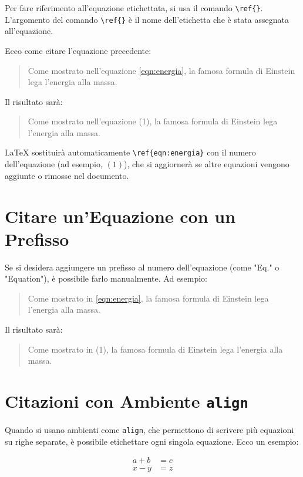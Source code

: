 Per fare riferimento all'equazione etichettata, si usa il comando \verb|\ref{}|. L'argomento del comando \verb|\ref{}| è il nome dell'etichetta che è stata assegnata all'equazione.

Ecco come citare l'equazione precedente:

\begin{quote}
	Come mostrato nell'equazione \ref{eqn:energia}, la famosa formula di Einstein lega l'energia alla massa.
\end{quote}

Il risultato sarà:

\begin{quote}
	Come mostrato nell'equazione (1), la famosa formula di Einstein lega l'energia alla massa.
\end{quote}

LaTeX sostituirà automaticamente \verb|\ref{eqn:energia}| con il numero dell'equazione (ad esempio, \((1)\)), che si aggiornerà se altre equazioni vengono aggiunte o rimosse nel documento.

\section{Citare un'Equazione con un Prefisso}

Se si desidera aggiungere un prefisso al numero dell'equazione (come "Eq." o "Equation"), è possibile farlo manualmente. Ad esempio:

\begin{quote}
	Come mostrato in  \ref{eqn:energia}, la famosa formula di Einstein lega l'energia alla massa.
\end{quote}

Il risultato sarà:

\begin{quote}
	Come mostrato in  (1), la famosa formula di Einstein lega l'energia alla massa.
\end{quote}

\section{Citazioni con Ambiente \texttt{align}}

Quando si usano ambienti come \verb|align|, che permettono di scrivere più equazioni su righe separate, è possibile etichettare ogni singola equazione. Ecco un esempio:

\begin{align}
	a + b &= c \label{eqn:somma} \\
	x - y &= z \label{eqn:diff}
\end{align}

